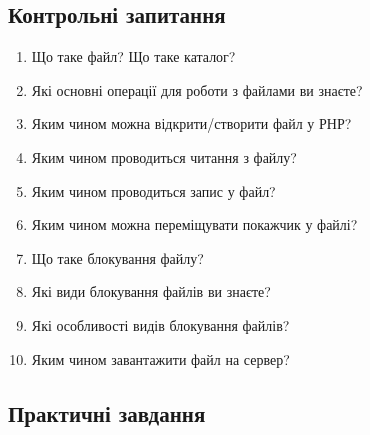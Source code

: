 \subsection*{Контрольні запитання}
\nopagebreak[4]
\begin{enumerate}
\item Що таке файл? Що таке каталог?
\item Які основні операції для роботи з файлами ви знаєте?
\item Яким чином можна відкрити/створити файл у РНР?
\item Яким чином проводиться читання з файлу?
\item Яким чином проводиться запис у файл?
\item Яким чином можна переміщувати покажчик у файлі?
\item Що таке блокування файлу?
\item Які види блокування файлів ви знаєте?
\item Які особливості видів блокування файлів?
\item Яким чином завантажити файл на сервер?

\end{enumerate}

\subsection*{Практичні завдання}
\nopagebreak[4]


